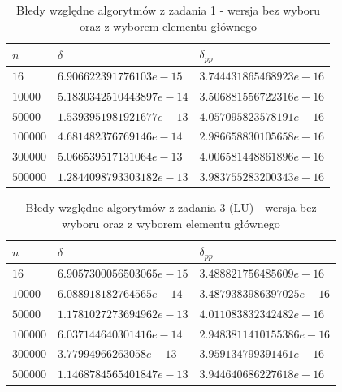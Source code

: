 \documentclass[11pt]{article}
\begin{document}
    \begin{table}[h!]
    \centering
    \begin{tabularx}{0.625\textwidth}{l l l}
        \hline
        $n$ & $\delta$ & $\delta_{pp}$ \\
        \hline
        $16$     & $6.906622391776103e-15$  & $3.744431865468923e-16$ \\
        $10000$  & $5.1830342510443897e-14$ & $3.506881556722316e-16$ \\
        $50000$  & $1.5393951981921677e-13$ & $4.057095823578191e-16$ \\
        $100000$ & $4.681482376769146e-14$  & $2.986658830105658e-16$ \\
        $300000$ & $5.066539517131064e-13$  & $4.006581448861896e-16$ \\
        $500000$ & $1.2844098793303182e-13$ & $3.983755283200343e-16$ \\
        \hline
    \end{tabularx}
    \label{table:error_ge_vs_gepp}
    \caption{Błedy względne algorytmów z zadania 1 - wersja bez wyboru oraz z wyborem elementu głównego}
    \end{table}

    \begin{table}[h!]
    \centering
    \begin{tabularx}{0.625\textwidth}{l l l}
        \hline
        $n$ & $\delta$ & $\delta_{pp}$ \\
        \hline
        $16$     & $6.9057300056503065e-15$ & $3.488821756485609e-16$  \\
        $10000$  & $6.088918182764565e-14$  & $3.4879383986397025e-16$ \\
        $50000$  & $1.1781027273694962e-13$ & $4.011083832342482e-16$  \\
        $100000$ & $6.037144640301416e-14$  & $2.9483811410155386e-16$ \\
        $300000$ & $3.77994966263058e-13$   & $3.959134799391461e-16$  \\
        $500000$ & $1.1468784565401847e-13$ & $3.944640686227618e-16$  \\
        \hline
    \end{tabularx}
    \label{table:error_luge_vs_lugepp}
    \caption{Błedy względne algorytmów z zadania 3 (LU) - wersja bez wyboru oraz z wyborem elementu głównego}
    \end{table}

    \newpage
\end{document}

